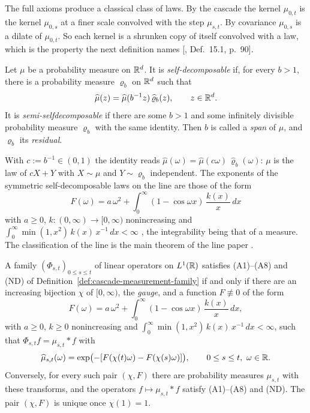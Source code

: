 The full axioms produce a classical class of laws. By the cascade the kernel $\mu_{0,t}$ is the
kernel $\mu_{0,s}$ at a finer scale convolved with the step $\mu_{s,t}$. By covariance
$\mu_{0,s}$ is a dilate of $\mu_{0,t}$. So each kernel is a shrunken copy of itself convolved with a
law, which is the property the next definition names [, Def.~15.1, p.~90].

\begin{definition}
\label{def:self-decomposable}

Let $\mu$ be a probability measure on $\mathbb{R}^d$. It is \emph{self-decomposable} if, for every
$b > 1$, there is a probability measure $\varrho_b$ on $\mathbb{R}^d$ such that
\[
  \widehat\mu(z) = \widehat\mu(b^{-1}z)\,\widehat\varrho_b(z), \qquad z \in \mathbb{R}^d.
\]
It is \emph{semi-selfdecomposable} if there are some $b > 1$ and some infinitely divisible
probability measure $\varrho_b$ with the same identity. Then $b$ is called a \emph{span} of $\mu$, and
$\varrho_b$ its \emph{residual}.
\end{definition}

With $c := b^{-1} \in (0,1)$ the identity reads
$\widehat\mu(\omega) = \widehat\mu(c\omega)\,\widehat\varrho_b(\omega)$: $\mu$ is the law of
$cX + Y$ with $X \sim \mu$ and $Y \sim \varrho_b$ independent. The exponents of the
symmetric self-decomposable laws on the line are those of the form
\begin{equation}
\label{eq:admissible-exponent}
  F(\omega) = a\,\omega^2 + \int_0^\infty(1 - \cos\omega x)\,\frac{k(x)}{x}\,dx
\end{equation}
with $a \ge 0$, $k : (0,\infty) \to [0,\infty)$ nonincreasing and
$\int_0^\infty\min(1, x^2)\,k(x)\,x^{-1}\,dx < \infty$ , the
integrability being that of a \Levy{} measure. The classification of the line is the main theorem
of the line paper .

\begin{theorem}
\label{thm:cited-A4}

A family $(\Phi_{s,t})_{0 \le s \le t}$ of linear operators on $L^1(\mathbb{R})$ satisfies (A1)--(A8)
and (ND) of Definition~\ref{def:cascade-measurement-family} if and only if there are an increasing
bijection $\chi$ of $[0,\infty)$, the \emph{gauge}, and a function $F \not\equiv 0$ of the form
\[
  F(\omega) = a\,\omega^2 + \int_0^\infty(1 - \cos\omega x)\,\frac{k(x)}{x}\,dx,
\]
with $a \ge 0$, $k \ge 0$ nonincreasing and
$\int_0^\infty\min(1, x^2)\,k(x)\,x^{-1}\,dx < \infty$, such that $\Phi_{s,t}f = \mu_{s,t} * f$ with
\[
  \widehat\mu_{s,t}(\omega) = \exp\bigl(-[F(\chi(t)\omega) - F(\chi(s)\omega)]\bigr),
  \qquad 0 \le s \le t,\ \omega \in \mathbb{R}.
\]
Conversely, for every such pair $(\chi, F)$ there are probability measures $\mu_{s,t}$ with
these transforms, and the operators $f \mapsto \mu_{s,t} * f$ satisfy (A1)--(A8) and (ND).
The pair $(\chi, F)$ is unique once $\chi(1) = 1$.
\end{theorem}

